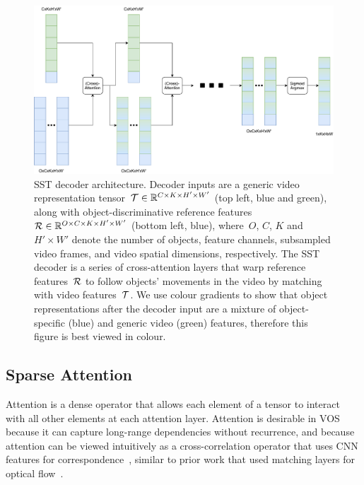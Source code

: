 \begin{figure}
\centering
\includegraphics[width=1.0\textwidth]{Figures/aina_decoder.pdf}
\caption{SST decoder architecture.
         Decoder inputs are a generic video representation
         tensor~$\mathcal{T}{}\in\mathbb{R}{}^{C\times K \times H'\times W'}$ (top
         left, blue and green), along with object-discriminative reference
         features~$\mathcal{R}{}\in\mathbb{R}{}^{O\times C\times K \times H'\times W'}$
         (bottom left, blue), where~$O$, $C$, $K$ and~$H'\times W'$ denote the
         number of objects, feature channels, subsampled video frames, and
         video spatial dimensions, respectively.
         The SST decoder is a series of cross-attention layers that warp
         reference features~$\mathcal{R}{}$ to follow objects' movements in the
         video by matching with video features~$\mathcal{T}{}$.
         We use colour gradients to show that object representations after the
         decoder input are a mixture of object-specific (blue) and generic
         video (green) features, therefore this figure is best viewed in
         colour.}
\label{fig:ainadecoder}
\end{figure}


\subsection{Sparse Attention}
\label{sec:sparse-attn}

Attention is a dense operator that allows each element of a tensor to interact
with all other elements at each attention layer.
Attention is desirable in VOS because it can capture long-range dependencies
without recurrence, and because attention can be viewed intuitively as a
cross-correlation operator that uses CNN features for
correspondence~\citep{long2014correspondence}, similar to prior work that used
matching layers for optical flow~\citep{dosovitskiy2015flownet}.

